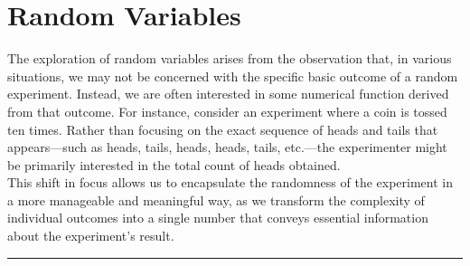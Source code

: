 \chapter{Random Variables}

The exploration of random variables arises from the observation that, in various situations, we may not be concerned with the specific basic outcome of a random experiment. Instead, we are often interested in some numerical function derived from that outcome.  For instance, consider an experiment where a coin is tossed ten times. Rather than focusing on the exact sequence of heads and tails that appears—such as heads, tails, heads, heads, tails, etc.—the experimenter might be primarily interested in the total count of heads obtained.\\

This shift in focus allows us to encapsulate the randomness of the experiment in a more manageable and meaningful way, as we transform the complexity of individual outcomes into a single number that conveys essential information about the experiment's result.







\vspace{30pt}
\hrule